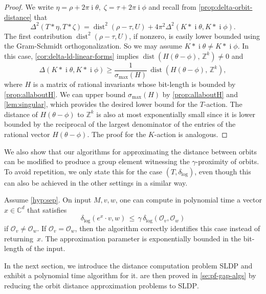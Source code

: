 \documentclass[a4paper,USenglish,cleveref,numberwithinsect]{lipics-v2021}
\DeclareMathOperator{\poly}{poly}
\DeclareMathOperator{\ii}{i}
\DeclareMathOperator{\dist}{dist}
\newcommand{\distLD}{\delta_{\log}}
\newcommand{\CC}{\mathbb{C}}
\newcommand{\ZZ}{\mathbb{Z}}
\newcommand{\OO}{\ensuremath{\mathcal{O}}}
\numberwithin{equation}{section}
\begin{document}
\begin{proof}
We write $\eta=\rho+2\pi\ii\theta,\; \zeta=\tau+2\pi\ii\phi$
and recall from  \cref{prop:delta-orbit-distance} that
\[
 \Delta^2(T\ast\eta,T\ast\zeta) =
 \dist^2( \rho-\tau, U) + 4\pi^2 \Delta^2(K\ast \ii\theta, K\ast \ii\phi) .
\]
The first contribution $\dist^2( \rho-\tau, U)$,
if nonzero, is easily lower bounded %
using the Gram-Schmidt orthogonalization.
So we may assume $K\ast \ii\theta\neq K\ast \ii\phi$.
In this case, \cref{cor:delta-ld-linear-forms}
implies
$\dist(H(\theta - \phi),\, \ZZ^k)\ne 0$ and
\[
  \Delta(K\ast\ii\theta,K\ast\ii\phi)
     \geq \frac{1}{\sigma_{\max}(H)}\, \dist(H(\theta - \phi),\, \ZZ^k) ,
\]
where $H$ is a matrix of rational invariants whose bit-length is bounded by \cref{prop:allaboutH}.
We can upper bound $\sigma_{\max}(H)$
by \cref{prop:allaboutH} and \cref{lem:singular},
which provides the desired lower bound for the $T$-action.
The distance of $H(\theta-\phi)$ to $\ZZ^k$ is also at most exponentially small since it is lower bounded by the reciprocal of the largest denominator of the entries of the rational vector $H(\theta-\phi)$.
The proof for the $K$-action is analogous.
\end{proof}


We also show that our algorithms for approximating the distance between orbits
can be modified to produce a group element witnessing the $\gamma$-proximity of orbits.
To avoid repetition, we only state this for the case $(T,\distLD)$, even though
this can also be achieved in the other settings in a similar way.


\begin{theorem}\label{thm:rop-witness}
Assume \cref{hyp:sep}.
On input $M,v,w$,
one can compute in polynomial time a vector $x\in\CC^d$ that satisfies
\begin{equation}
\label{eq:rop-witness}
  \distLD( e^x\cdot v, w ) \, \leq \, \gamma \, \distLD(\OO_v,\OO_w)
\end{equation}
if $\OO_v\neq \OO_w$. If $\OO_v=\OO_w$,
then the algorithm correctly identifies this case instead of returning~$x$.
The approximation parameter is exponentially bounded in the
bit-length of the input.
\end{theorem}



In the next section, we introduce the distance computation problem \textsc{SLDP}
and exhibit a polynomial time algorithm for it.
 are then proved in \cref{se:pf-gap-algs} by
reducing the  orbit distance approximation problems to \textsc{SLDP}.
\end{document}
